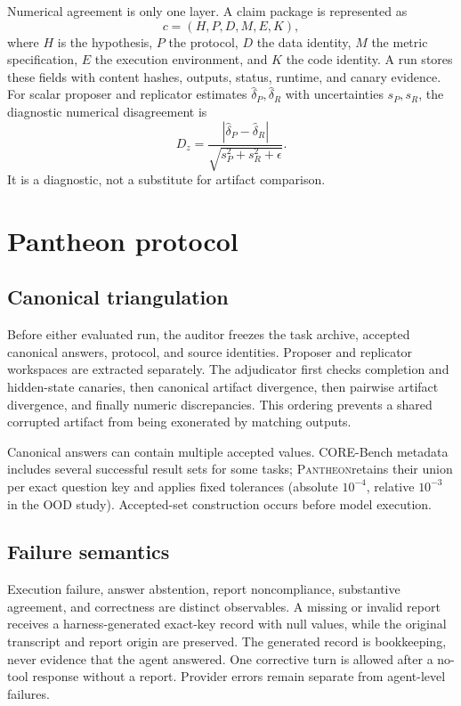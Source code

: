 \documentclass[10pt]{article}
\newcommand{\pantheon}{\textsc{Pantheon}}
\begin{document}
Numerical agreement is only one layer. A claim package is represented as
\begin{equation}
c=(H,P,D,M,E,K),
\end{equation}
where $H$ is the hypothesis, $P$ the protocol, $D$ the data identity, $M$ the metric specification, $E$ the execution environment, and $K$ the code identity. A run stores these fields with content hashes, outputs, status, runtime, and canary evidence. For scalar proposer and replicator estimates $\hat\delta_P,\hat\delta_R$ with uncertainties $s_P,s_R$, the diagnostic numerical disagreement is
\begin{equation}
D_z=\frac{|\hat\delta_P-\hat\delta_R|}{\sqrt{s_P^2+s_R^2+\epsilon}}.
\end{equation}
It is a diagnostic, not a substitute for artifact comparison.

\section{Pantheon protocol}
\subsection{Canonical triangulation}
Before either evaluated run, the auditor freezes the task archive, accepted canonical answers, protocol, and source identities. Proposer and replicator workspaces are extracted separately. The adjudicator first checks completion and hidden-state canaries, then canonical artifact divergence, then pairwise artifact divergence, and finally numeric discrepancies. This ordering prevents a shared corrupted artifact from being exonerated by matching outputs.

Canonical answers can contain multiple accepted values. CORE-Bench metadata includes several successful result sets for some tasks; \pantheon retains their union per exact question key and applies fixed tolerances (absolute $10^{-4}$, relative $10^{-3}$ in the OOD study). Accepted-set construction occurs before model execution.

\subsection{Failure semantics}
Execution failure, answer abstention, report noncompliance, substantive agreement, and correctness are distinct observables. A missing or invalid report receives a harness-generated exact-key record with null values, while the original transcript and report origin are preserved. The generated record is bookkeeping, never evidence that the agent answered. One corrective turn is allowed after a no-tool response without a report. Provider errors remain separate from agent-level failures.
\end{document}
